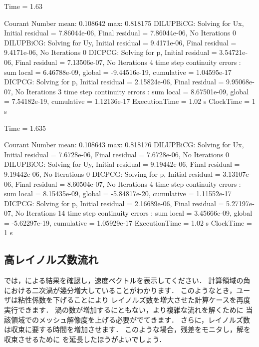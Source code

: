 \begin{OFverbatim}[file, linenum, weight=\footnotesize]

Time = 1.63

Courant Number mean: 0.108642 max: 0.818175
DILUPBiCG:  Solving for Ux, Initial residual = 7.86044e-06, Final residual = 7.86044e-06,
No Iterations 0
DILUPBiCG:  Solving for Uy, Initial residual = 9.4171e-06, Final residual = 9.4171e-06,
No Iterations 0
DICPCG:  Solving for p, Initial residual = 3.54721e-06, Final residual = 7.13506e-07,
No Iterations 4
time step continuity errors : sum local = 6.46788e-09, global = -9.44516e-19,
cumulative = 1.04595e-17
DICPCG:  Solving for p, Initial residual = 2.15824e-06, Final residual = 9.95068e-07,
No Iterations 3
time step continuity errors : sum local = 8.67501e-09, global = 7.54182e-19,
cumulative = 1.12136e-17
ExecutionTime = 1.02 s  ClockTime = 1 s

Time = 1.635

Courant Number mean: 0.108643 max: 0.818176
DILUPBiCG:  Solving for Ux, Initial residual = 7.6728e-06, Final residual = 7.6728e-06,
No Iterations 0
DILUPBiCG:  Solving for Uy, Initial residual = 9.19442e-06, Final residual = 9.19442e-06,
No Iterations 0
DICPCG:  Solving for p, Initial residual = 3.13107e-06, Final residual = 8.60504e-07,
No Iterations 4
time step continuity errors : sum local = 8.15435e-09, global = -5.84817e-20,
cumulative = 1.11552e-17
DICPCG:  Solving for p, Initial residual = 2.16689e-06, Final residual = 5.27197e-07,
No Iterations 14
time step continuity errors : sum local = 3.45666e-09, global = -5.62297e-19,
cumulative = 1.05929e-17
ExecutionTime = 1.02 s  ClockTime = 1 s
\end{OFverbatim}


\subsection{高レイノルズ数流れ}
\label{ssec:2.1.8}
では，による結果を確認し，速度ベクトルを表示してください．
計算領域の角における二次渦が幾分増大していることがわかります．
このようなとき，ユーザは粘性係数を下げることにより
レイノルズ数を増大させた計算ケースを再度実行できます．
渦の数が増加するにともない，より複雑な流れを解くために
当該領域でのメッシュ解像度を上げる必要がでてきます．
さらに，レイノルズ数は収束に要する時間を増加させます．
このような場合，残差をモニタし，解を収束させるために
を延長したほうがよいでしょう．


